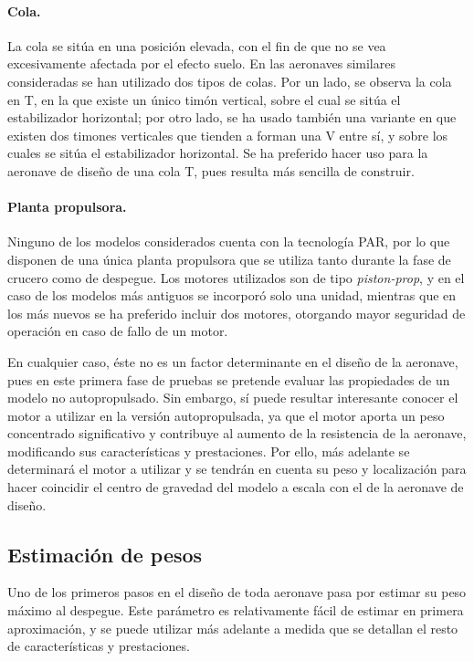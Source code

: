 \paragraph{Cola.} La cola se sitúa en una posición elevada, con el fin de que no se vea excesivamente afectada por el efecto suelo. En las aeronaves similares consideradas se han utilizado dos tipos de colas. Por un lado, se observa la cola en T, en la que existe un único timón vertical, sobre el cual se sitúa el estabilizador horizontal; por otro lado, se ha usado también una variante en que existen dos timones verticales que tienden a forman una V entre sí, y sobre los cuales se sitúa el estabilizador horizontal. Se ha preferido hacer uso para la aeronave de diseño de una cola T, pues resulta más sencilla de construir.

\paragraph{Planta propulsora.} Ninguno de los modelos considerados cuenta con la tecnología PAR, por lo que disponen de una única planta propulsora que se utiliza tanto durante la fase de crucero como de despegue. Los motores utilizados son de tipo \emph{piston-prop}, y en el caso de los modelos más antiguos se incorporó solo una unidad, mientras que en los más nuevos se ha preferido incluir dos motores, otorgando mayor seguridad de operación en caso de fallo de un motor.

En cualquier caso, éste no es un factor determinante en el diseño de la aeronave, pues en este primera fase de pruebas se pretende evaluar las propiedades de un modelo no autopropulsado. Sin embargo, sí puede resultar interesante conocer el motor a utilizar en la versión autopropulsada, ya que el motor aporta un peso concentrado significativo y contribuye al aumento de la resistencia de la aeronave, modificando sus características y prestaciones. Por ello, más adelante se determinará el motor a utilizar y se tendrán en cuenta su peso y localización para hacer coincidir el centro de gravedad del modelo a escala con el de la aeronave de diseño.


\subsection{Estimación de pesos}
\label{sec:design:weights}

Uno de los primeros pasos en el diseño de toda aeronave pasa por estimar su peso máximo al despegue. Este parámetro es relativamente fácil de estimar en primera aproximación, y se puede utilizar más adelante a medida que se detallan el resto de características y prestaciones.

